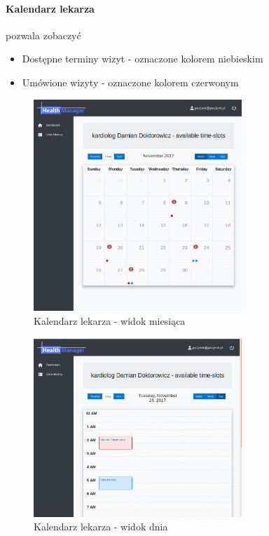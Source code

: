 \documentclass[polish,12pt]{aghthesis}
\begin{document}
    \paragraph{Kalendarz lekarza}{ pozwala zobaczyć
    \begin{itemize}
        \item Dostępne terminy wizyt - oznaczone kolorem niebieskim
        \item Umówione wizyty - oznaczone kolorem czerwonym
    \end{itemize}
    
    
    \begin{figure}[H]
        \includegraphics[width=0.7\textwidth]{gui-calendar-patient-month}
        \caption{Kalendarz lekarza - widok miesiąca}
    \end{figure}    
    \begin{figure}[H]
        \includegraphics[width=0.7\textwidth]{gui-calendar-patient-day}
        \caption{Kalendarz lekarza - widok dnia}
    \end{figure}    
    }
\end{document}
